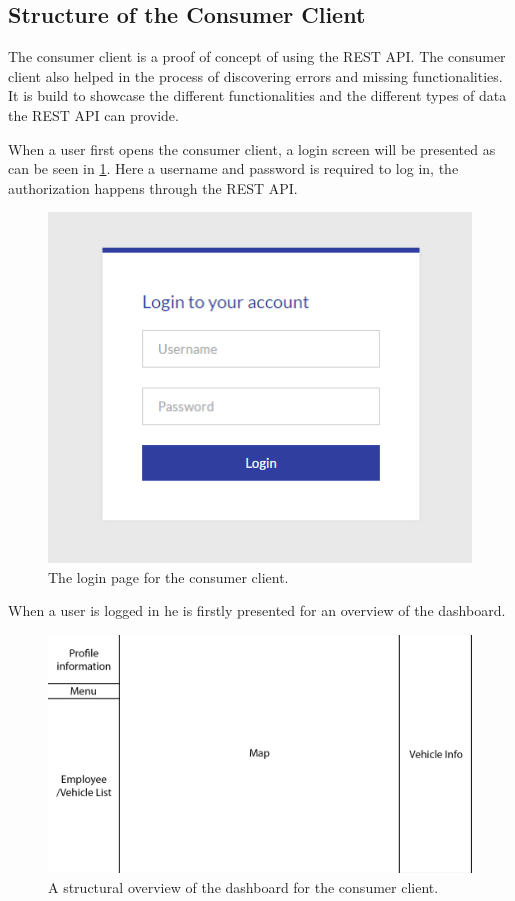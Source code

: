 \subsection{Structure of the Consumer Client}\label{ssec:consumer_client_structure}
The consumer client is a proof of concept of using the REST API.
The consumer client also helped in the process of discovering errors and missing functionalities.
It is build to showcase the different functionalities and the different types of data the REST API can provide.

When a user first opens the consumer client, a login screen will be presented as can be seen in \cref{fig:ConsumerClientLogin}.
Here a username and password is required to log in, the authorization happens through the REST \ac{API}.
\begin{figure}[h]
    \centering
    \includegraphics[scale=0.5]{img/ConsumerClientLogin.png}
    \caption{The login page for the consumer client.}
    \label{fig:ConsumerClientLogin}
\end{figure}

When a user is logged in he is firstly presented for an overview of the dashboard.

\begin{figure}[h]
    \centering
    \includegraphics[scale=0.15]{img/ConsumerClientWText.png}
    \caption{A structural overview of the dashboard for the consumer client.}
    \label{fig:ConsumerClientLayout}
\end{figure}

